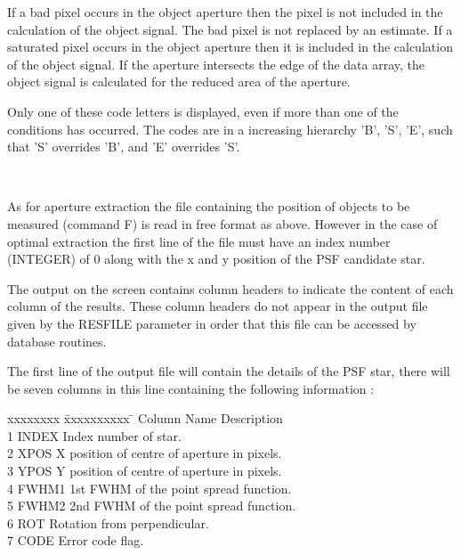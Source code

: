 \documentclass[twoside,11pt]{article}
\renewcommand{\_}{\texttt{\symbol{95}}}
\newcommand{\sstsubsection}[1]{ \item[{#1}] \mbox{} \\}
\newcommand{\sstsubsection}[1]{\item[{#1}]}
\begin{document}
{{   If a bad pixel occurs in the object aperture then the pixel is not
   included in the calculation of the object signal. The bad pixel is not
   replaced by an estimate. If a saturated pixel occurs in the object
   aperture then it is included in the calculation of the object signal.
   If the aperture intersects the edge of the data array, the object signal
   is calculated for the reduced area of the aperture.

   Only one of these code letters is displayed, even if more than one of the
   conditions has occurred. The codes are in a increasing hierarchy 'B', 'S',
   'E', such that 'S' overrides 'B', and 'E' overrides 'S'.
   }

   \sstsubsection{
      Optimal  Extraction -- Format of Associated Files:
    } {

   As for aperture extraction the file containing the position of objects
   to be measured (command F) is read in free format as above. However in
   the case of optimal extraction the first line of the file must have an
   index number (INTEGER) of 0 along with the x and y position of the PSF
   candidate star.

   The output on the screen contains column headers to indicate the content of
   each column of the results. These column headers do not appear in the
   output file given by the RESFILE parameter in order that this file can be
   accessed by database routines.

   The first line of the output file will contain the details of the PSF star,
   there will be seven columns in this line containing the following information :

   \begin{tabbing}
   xxxxxxxx \= xxxxxxxxxx \= \kill
   Column \> Name  \> Description \\
    1 \> INDEX \> Index number of star.\\
    2 \> XPOS \> X position of centre of aperture in pixels.\\
    3 \> YPOS \> Y position of centre of aperture in pixels.\\
    4 \> FWHM1 \> 1st FWHM of the point spread function.\\
    5 \> FWHM2 \> 2nd FWHM of the point spread function.\\
    6 \> ROT \> Rotation from perpendicular.\\
    7 \> CODE \> Error code flag.\\
   \end{tabbing}

}}
\end{document}
